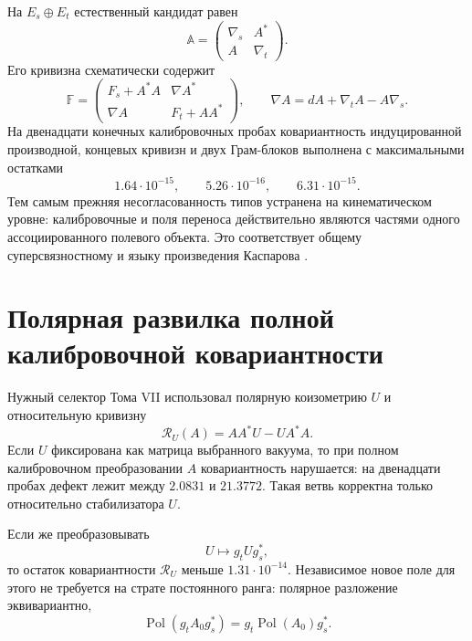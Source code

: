 На $E_s\oplus E_t$ естественный кандидат равен
\begin{equation}
 \mathbb A=
 \begin{pmatrix}
  \nabla_s&A^*\\
  A&\nabla_t
 \end{pmatrix}.
 \label{eq:v8-endpoint-field-superconnection}
\end{equation}
Его кривизна схематически содержит
\begin{equation}
 \mathbb F=
 \begin{pmatrix}
  F_s+A^*A&\nabla A^*\\
  \nabla A&F_t+AA^*
 \end{pmatrix},
 \qquad
 \nabla A=dA+\nabla_tA-A\nabla_s.
 \label{eq:v8-endpoint-field-supercurvature}
\end{equation}
На двенадцати конечных калибровочных пробах ковариантность индуцированной
производной, концевых кривизн и двух Грам-блоков выполнена с максимальными
остатками
\begin{equation}
 1.64\cdot10^{-15},\qquad
 5.26\cdot10^{-16},\qquad
 6.31\cdot10^{-15}.
 \label{eq:v8-field-supercurvature-covariance-residuals}
\end{equation}
Тем самым прежняя несогласованность типов устранена на кинематическом уровне: калибровочные и
поля переноса действительно являются частями одного ассоциированного
полевого объекта. Это соответствует общему суперсвязностному и
языку произведения Каспарова \cite{v8-field-space-roepstorff,
v8-field-space-brain}.

\section{Полярная развилка полной калибровочной ковариантности}

Нужный селектор Тома VII использовал полярную коизометрию $U$ и
относительную кривизну
\begin{equation}
 \mathcal R_U(A)=AA^*U-UA^*A.
 \label{eq:v8-field-space-relative-polar-curvature}
\end{equation}
Если $U$ фиксирована как матрица выбранного вакуума, то при полном калибровочном
преобразовании $A$ ковариантность нарушается: на двенадцати пробах дефект
лежит между $2.0831$ и $21.3772$. Такая ветвь корректна только относительно
стабилизатора $U$.

Если же преобразовывать
\begin{equation}
 U\longmapsto g_tUg_s^*,
 \label{eq:v8-moving-polar-transformation}
\end{equation}
то остаток ковариантности $\mathcal R_U$ меньше $1.31\cdot10^{-14}$.
Независимое новое поле для этого не требуется на страте постоянного ранга:
полярное разложение эквивариантно,
\begin{equation}
 \operatorname{Pol}(g_tA_0g_s^*)
 =g_t\operatorname{Pol}(A_0)g_s^*.
 \label{eq:v8-polar-equivariance}
\end{equation}

